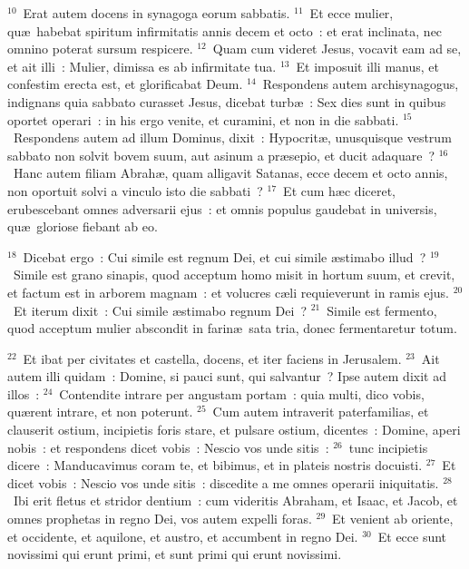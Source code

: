 ${}^{10}$~Erat autem docens in synagoga eorum sabbatis.
${}^{11}$~Et ecce mulier, qu\ae\ habebat spiritum infirmitatis annis decem et octo~: et erat inclinata, nec omnino poterat sursum respicere.
${}^{12}$~Quam cum videret Jesus, vocavit eam ad se, et ait illi~: Mulier, dimissa es ab infirmitate tua.
${}^{13}$~Et imposuit illi manus, et confestim erecta est, et glorificabat Deum.
${}^{14}$~Respondens autem archisynagogus, indignans quia sabbato curasset Jesus, dicebat turb\ae~: Sex dies sunt in quibus oportet operari~: in his ergo venite, et curamini, et non in die sabbati.
${}^{15}$~Respondens autem ad illum Dominus, dixit~: Hypocrit\ae , unusquisque vestrum sabbato non solvit bovem suum, aut asinum a pr\ae sepio, et ducit adaquare~?
${}^{16}$~Hanc autem filiam Abrah\ae , quam alligavit Satanas, ecce decem et octo annis, non oportuit solvi a vinculo isto die sabbati~?
${}^{17}$~Et cum h\ae c diceret, erubescebant omnes adversarii ejus~: et omnis populus gaudebat in universis, qu\ae\ gloriose fiebant ab eo.


${}^{18}$~Dicebat ergo~: Cui simile est regnum Dei, et cui simile \ae stimabo illud~?
${}^{19}$~Simile est grano sinapis, quod acceptum homo misit in hortum suum, et crevit, et factum est in arborem magnam~: et volucres c\ae li requieverunt in ramis ejus.
${}^{20}$~Et iterum dixit~: Cui simile \ae stimabo regnum Dei~?
${}^{21}$~Simile est fermento, quod acceptum mulier abscondit in farin\ae\ sata tria, donec fermentaretur totum.


${}^{22}$~Et ibat per civitates et castella, docens, et iter faciens in Jerusalem.
${}^{23}$~Ait autem illi quidam~: Domine, si pauci sunt, qui salvantur~? Ipse autem dixit ad illos~:
${}^{24}$~Contendite intrare per angustam portam~: quia multi, dico vobis, qu\ae rent intrare, et non poterunt.
${}^{25}$~Cum autem intraverit paterfamilias, et clauserit ostium, incipietis foris stare, et pulsare ostium, dicentes~: Domine, aperi nobis~: et respondens dicet vobis~: Nescio vos unde sitis~:
${}^{26}$~tunc incipietis dicere~: Manducavimus coram te, et bibimus, et in plateis nostris docuisti.
${}^{27}$~Et dicet vobis~: Nescio vos unde sitis~: discedite a me omnes operarii iniquitatis.
${}^{28}$~Ibi erit fletus et stridor dentium~: cum videritis Abraham, et Isaac, et Jacob, et omnes prophetas in regno Dei, vos autem expelli foras.
${}^{29}$~Et venient ab oriente, et occidente, et aquilone, et austro, et accumbent in regno Dei.
${}^{30}$~Et ecce sunt novissimi qui erunt primi, et sunt primi qui erunt novissimi.


